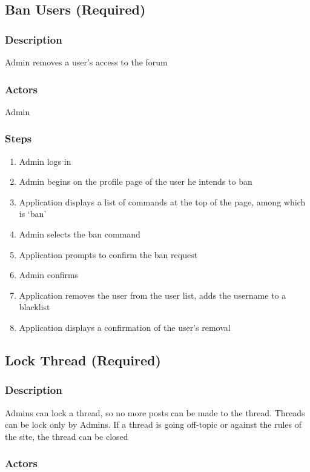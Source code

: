 \documentclass[12pt]{scrartcl}
\begin{document}
\subsection{Ban Users (Required)}
\subsubsection{Description}
 
Admin removes a user’s access to the forum

\subsubsection{Actors}
 
Admin
 
\subsubsection{Steps}
\begin{enumerate}
\item Admin logs in
\item Admin begins on the profile page of the user he intends to ban
\item Application displays a list of commands at the top of the page, among which is ‘ban’
\item Admin selects the ban command
\item Application prompts to confirm the ban request
\item Admin confirms
\item Application removes the user from the user list, adds the username to a blacklist
\item Application displays a confirmation of the user’s removal
\end {enumerate}



\subsection{Lock Thread (Required)}
\subsubsection{Description}
Admins can lock a thread, so no more posts can be made to the thread. Threads can be lock only by Admins.
If a thread is going off-topic or against the rules of the site, the thread can be closed 

\subsubsection{Actors}
\end{document}
